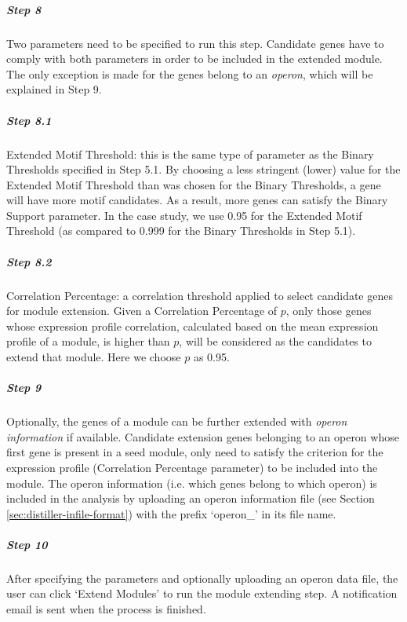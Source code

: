 \vspace{-5mm}\begin{adjustwidth}{3mm}{0cm}
\nointerlineskip\leavevmode
\subparagraph{Step 8} Two parameters need to be specified to run this 
step. Candidate genes have to comply with both parameters in order to be 
included in the extended module. The only exception is made for the genes 
belong to an \textit{operon}, which will be explained in Step 9. 

\vspace{-5mm}\begin{adjustwidth}{3mm}{0cm}
\nointerlineskip\leavevmode
\subparagraph{Step 8.1} Extended Motif Threshold: this is the same type of 
parameter as the Binary Thresholds specified in Step 5.1. 
By choosing a less stringent (lower) value for the Extended Motif Threshold 
than was chosen for the Binary Thresholds, a gene will have more motif 
candidates. As a result, more genes can satisfy the Binary Support parameter. 
In the case study, we use 0.95 for the Extended Motif Threshold (as compared to 
0.999 for the Binary Thresholds in Step 5.1).

\subparagraph{Step 8.2}	Correlation Percentage: a correlation threshold applied 
to select candidate genes for module extension. 
Given a Correlation Percentage of $p$, only those genes whose expression 
profile correlation, calculated based on the mean expression profile of a 
module, is higher than $p$, will be considered as the candidates to extend that 
module. Here we choose $p$ as 0.95.
\end{adjustwidth}

\subparagraph{Step 9} Optionally, the genes of a module can be further 
extended with \textit{operon information} if available. 
Candidate extension genes belonging to an operon whose first gene is present in 
a seed module, only need to satisfy the criterion for the expression profile 
(Correlation Percentage parameter) to be included into the module. 
The operon information (i.e. which genes belong to which operon) is included in 
the analysis by uploading an operon information file (see Section 
\ref{sec:distiller-infile-format}) with the prefix `operon\_' in its file name.

\subparagraph{Step 10} After specifying the parameters and optionally 
uploading an operon data file, the user can click `Extend Modules' to run the 
module extending step. 
A notification email is sent when the process is finished.
\end{adjustwidth}

